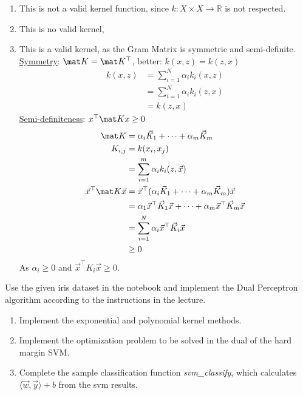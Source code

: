 \begin{solution}[print=true]
\begin{enumerate}[label=\emph{\alph*)}]
	\item This is not a valid kernel function, since $k: X\times X \to \mathbb R$ is not respected.
	\item This is no valid kernel,
	\item This is a valid kernel, as the Gram Matrix is symmetric and semi-definite.\\
	\underline{Symmetry}: $\mat K = \mat K^\top$, better:	$k(x,z) =  k(z,x)$
	\begin{align}
	k(x,z) &= \sum_{i=1}^N \alpha_i k_i(x, z)\\
	&= \sum_{i=1}^N \alpha_i k_i(z, x)\\
	&= k(z,x)
	\end{align}	
	\underline{Semi-definiteness}: $x^\top \mat K x \geq 0$
	\begin{align*}
	\mat K &= \alpha_i \vec K_1 + \dots + \alpha_m \vec K_m\\
	K_{i,j} &= k(x_i, x_j)\\
	&= \sum_{i=1}^{m} \alpha_i k_i(z,\vec x)\\
	\vec x^\top \mat K \vec x &= \vec x^\top (\alpha_i \vec K_1 + \dots + \alpha_m \vec K_m)\vec x\\
	&= \alpha_1 \vec x^\top \vec K_1 \vec x + \dots + \alpha_m \vec x^\top \vec K_m \vec x\\
	&= \sum_{i=1}^{N} \alpha_i \vec x^\top \vec K_i \vec x\\
	&\geq 0\\
	\end{align*}
	As $\alpha_i \geq 0$ and $\vec x^\top K_i \vec x \geq 0$.
\end{enumerate}
\end{solution}


\begin{exercise}[subtitle={Notebook}]
	Use the given iris dataset in the notebook and implement the Dual Perceptron algorithm according to the instructions in the lecture.
\end{exercise}


\begin{exercise}[subtitle={Notebook}]
\begin{enumerate}[label=\emph{\alph*)}]
  \item Implement the exponential and polynomial kernel methods.
  \item Implement the optimization problem to be solved in the dual of the hard margin SVM.
  \item Complete the sample classification function \textit{svm\_classify}, which calculates $\langle \vec w, \vec y \rangle + b$ from the svm results.
  \end{enumerate}
   
\end{exercise}


